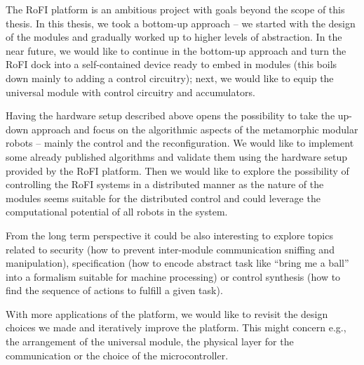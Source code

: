 The RoFI platform is an ambitious project with goals beyond the scope of this
thesis. In this thesis, we took a bottom-up approach -- we started with the
design of the modules and gradually worked up to higher levels of abstraction.
In the near future, we would like to continue in the bottom-up approach and turn
the RoFI dock into a self-contained device ready to embed in modules (this boils
down mainly to adding a control circuitry); next, we would like to equip the
universal module with control circuitry and accumulators.

Having the hardware setup described above opens the possibility to take the
up-down approach and focus on the algorithmic aspects of the metamorphic modular
robots -- mainly the control and the reconfiguration. We would like to implement
some already published algorithms and validate them using the hardware setup
provided by the RoFI platform. Then we would like to explore the possibility of
controlling the RoFI systems in a distributed manner as the nature of the
modules seems suitable for the distributed control and could leverage the
computational potential of all robots in the system.

From the long term perspective it could be also interesting to explore topics
related to security (how to prevent inter-module communication sniffing and
manipulation), specification (how to encode abstract task like ``bring me a
ball'' into a formalism suitable for machine processing) or control synthesis
(how to find the sequence of actions to fulfill a given task).

With more applications of the platform, we would like to revisit the design
choices we made and iteratively improve the platform. This might concern e.g.,
the arrangement of the universal module, the physical layer for the
communication or the choice of the microcontroller.